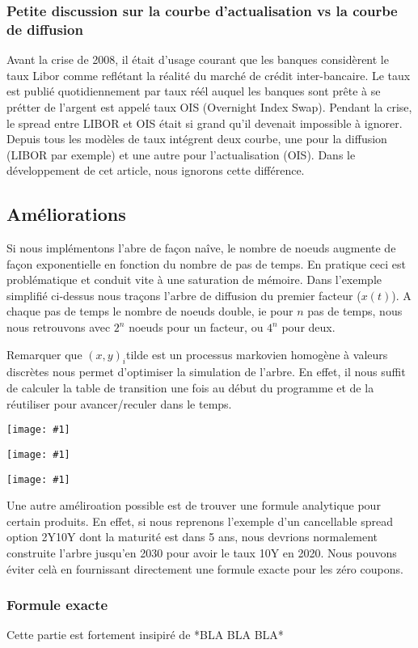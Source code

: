 \documentclass[paper=a4, fontsize=11pt]{scrartcl}
\numberwithin{equation}{section}		%
\numberwithin{figure}{section}			%
\numberwithin{table}{section}				%
\theoremstyle{definition}
\newcommand{\IMG}[3]{
  \begin{center}
    \texttt{[image: \#1]}%
    \end{center}
}
\begin{document}
  \subsubsection*{Petite discussion sur la courbe d'actualisation vs la courbe de diffusion}
  Avant la crise de 2008, il était d'usage courant que les banques considèrent le taux Libor comme reflétant la réalité du marché de crédit inter-bancaire. Le taux est publié quotidiennement par
taux réél auquel les banques sont prête à se prétter de l'argent est appelé taux OIS (Overnight Index Swap).  
Pendant la crise, le spread entre LIBOR et OIS était si grand qu'il devenait impossible à ignorer. Depuis tous les modèles de taux intégrent deux courbe, une pour la diffusion (LIBOR par exemple) et une autre pour l'actualisation (OIS).
Dans le développement de cet article, nous ignorons cette différence.
  
\subsection{Améliorations}
Si nous implémentons l'abre de façon naîve, le nombre de noeuds augmente de façon exponentielle en fonction du nombre de pas de temps. En pratique ceci est problématique et conduit vite à une saturation de mémoire. Dans l'exemple simplifié ci-dessus nous traçons l'arbre de diffusion du premier facteur ($x(t)$). A chaque pas de temps le nombre de noeuds double, ie pour $n$ pas de temps, nous nous retrouvons avec $2^n$ noeuds pour un facteur, ou $4^n$ pour deux. 

Remarquer que $(x, y)_i$tilde est un processus markovien homogène à valeurs discrètes nous permet d'optimiser la simulation de l'arbre. En effet, il nous suffit de calculer la table de transition une fois au début du programme et de la réutiliser pour avancer/reculer dans le temps. 




\IMG{img/slice.png}{Slice}{0.5}
\IMG{img/pending.jpg}{Cache grind avant}{0.2}
\IMG{img/pending.jpg}{Cache grind avant}{0.2}

Une autre améliroation possible est de trouver une formule analytique pour certain produits. En effet, si nous reprenons l'exemple d'un cancellable spread option 2Y10Y dont la maturité est dans 5 ans, nous devrions normalement construite l'arbre jusqu'en 2030 pour avoir le taux 10Y en 2020. Nous pouvons éviter celà en fournissant directement une formule exacte pour les zéro coupons.

\subsubsection{Formule exacte}
Cette partie est fortement insipiré de *BLA BLA BLA*
\end{document}
